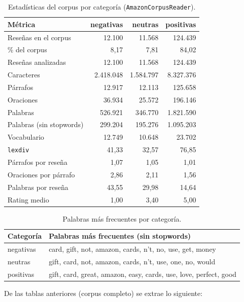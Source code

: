 \documentclass[10pt,a4paper]{article}
\begin{document}
\begin{table}[h]
\centering
\begin{tabular}{lrrr}
\toprule
Métrica & negativas & neutras & positivas \\
\midrule
Reseñas en el corpus & 12.100 & 11.568 & 124.439 \\
\% del corpus & 8,17 & 7,81 & 84,02 \\
Reseñas analizadas & 12.100 & 11.568 & 124.439 \\
Caracteres & 2.418.048 & 1.584.797 & 8.327.376 \\
Párrafos & 12.917 & 12.113 & 125.658 \\
Oraciones & 36.934 & 25.572 & 196.146 \\
Palabras & 526.921 & 346.770 & 1.821.590 \\
Palabras (sin stopwords) & 299.204 & 195.276 & 1.095.203 \\
Vocabulario & 12.749 & 10.648 & 23.702 \\
\texttt{lexdiv} & 41,33 & 32,57 & 76,85 \\
Párrafos por reseña & 1,07 & 1,05 & 1,01 \\
Oraciones por párrafo & 2,86 & 2,11 & 1,56 \\
Palabras por reseña & 43,55 & 29,98 & 14,64 \\
Rating medio & 1,00 & 3,40 & 5,00 \\
\bottomrule
\end{tabular}
\caption{Estadísticas del corpus por categoría (\texttt{AmazonCorpusReader}).}
\label{tab:estadisticas}
\end{table}

\begin{table}[h]
\centering
\begin{tabularx}{\textwidth}{lX}
\toprule
Categoría & Palabras más frecuentes (sin stopwords) \\
\midrule
negativas & card, gift, not, amazon, cards, n't, no, use, get, money \\
neutras & gift, card, not, amazon, cards, n't, use, one, no, would \\
positivas & gift, card, great, amazon, easy, cards, use, love, perfect, good \\
\bottomrule
\end{tabularx}
\caption{Palabras más frecuentes por categoría.}
\label{tab:top-palabras}
\end{table}

\noindent De las tablas anteriores (corpus completo) se extrae lo siguiente:
\end{document}
